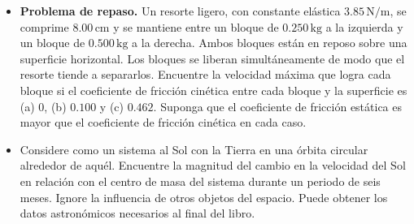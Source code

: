 \documentclass[11pt,a4paper]{article}
\begin{document}
\begin{itemize}
    \item[\textbf{49.}] \textbf{Problema de repaso.} Un resorte ligero, con constante elástica \(3.85\,\text{N/m}\), se comprime \(8.00\,\text{cm}\) y se mantiene entre un bloque de \(0.250\,\text{kg}\) a la izquierda y un bloque de \(0.500\,\text{kg}\) a la derecha. Ambos bloques están en reposo sobre una superficie horizontal. Los bloques se liberan simultáneamente de modo que el resorte tiende a separarlos. Encuentre la velocidad máxima que logra cada bloque si el coeficiente de fricción cinética entre cada bloque y la superficie es (a) \(0\), (b) \(0.100\) y (c) \(0.462\). Suponga que el coeficiente de fricción estática es mayor que el coeficiente de fricción cinética en cada caso.
    \vspace*{7cm}

    \item[\textbf{50.}] Considere como un sistema al Sol con la Tierra en una órbita circular alrededor de aquél. Encuentre la magnitud del cambio en la velocidad del Sol en relación con el centro de masa del sistema durante un periodo de seis meses. Ignore la influencia de otros objetos del espacio. Puede obtener los datos astronómicos necesarios al final del libro.
    \vspace*{6cm}


\end{itemize}
\end{document}
